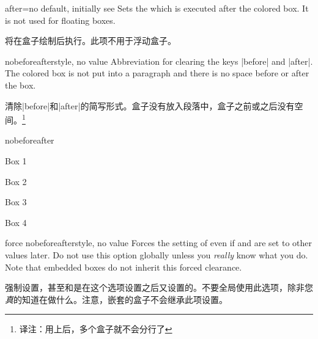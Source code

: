 \begin{docTcbKey}{after}{=}{no default, initially see }
Sets the  which is executed after the colored box.
It is not used for floating boxes.

将在盒子绘制后执行。此项不用于浮动盒子。
\end{docTcbKey}


\begin{docTcbKey}{nobeforeafter}{}{style, no value}
Abbreviation for clearing the keys |before| and |after|. The colored box
is not put into a paragraph and there is no space before or after the box.


清除|before|和|after|的简写形式。盒子没有放入段落中，盒子之前或之后没有空间。\footnote{译注：用上后，多个盒子就不会分行了}
\begin{exdispExample}{nobeforeafter}
\begin{tcolorbox}[myone,title=Box 1]Box 1\end{tcolorbox}%
\begin{tcolorbox}[myone,title=Box 2]Box 2\end{tcolorbox}%
\begin{tcolorbox}[myone,title=Box 3]Box 3\end{tcolorbox}%
\begin{tcolorbox}[myone,title=Box 4]Box 4\end{tcolorbox}
\end{exdispExample}
\end{docTcbKey}



\begin{docTcbKey}{force nobeforeafter}{}{style, no value}
Forces the setting of  even if
 and  are set to other values
later. Do not use this option globally unless you \emph{really} know what you do.
Note that embedded boxes do not inherit this forced clearance.

强制设置，甚至和是在这个选项设置之后又设置的。不要全局使用此选项，除非您\emph{真}的知道在做什么。注意，嵌套的盒子不会继承此项设置。
\end{docTcbKey}


